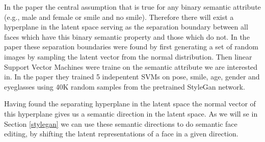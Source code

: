 In the paper the central assumption that is true for any binary semantic attribute (e.g., male  and female or smile and no smile).\cite{interfacegan} Therefore there will exist a hyperplane in the latent space serving as the separation boundary between all faces which have this binary semantic property and those which do not.
In the paper these separation boundaries were found by first generating a set of random images by sampling the latent vector from the normal distribution. Then linear Support Vector Machines were traine on the semantic attribute we are interested in. In the paper they trained 5 indepentent SVMs on pose, smile, age, gender and eyeglasses using 40K random samples from the pretrained StyleGan network. 

Having found the separating hyperplane in the latent space the normal vector of this hyperplane gives us a semantic direction in the latent space. As we will se in Section \ref{stylegan} we can use these semantic directions to do semantic face editing, by shifting the latent representations of a face in a given direction.









%
%



%
%
%
